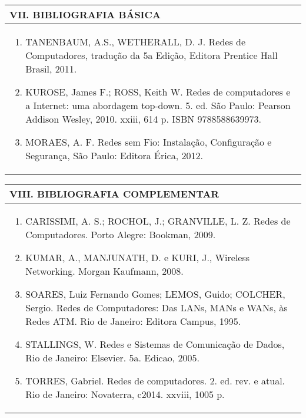 \documentclass[12pt]{article}
\begin{document}

\begin{longtable}{|L{1.025\textwidth}|} \hline
%
{\bf VII. BIBLIOGRAFIA BÁSICA} \\ \hline
\begin{enumerate}
%
\item TANENBAUM, A.S., WETHERALL, D. J. Redes de Computadores, tradução da 5a Edição, Editora Prentice Hall Brasil, 2011. 
\item  KUROSE, James F.; ROSS, Keith W. Redes de computadores e a Internet: uma abordagem top-down. 5. ed. São Paulo: Pearson Addison Wesley, 2010. xxiii, 614 p. ISBN 9788588639973.
\item  MORAES, A. F. Redes sem Fio: Instalação, Configuração e Segurança, São Paulo: Editora Érica, 2012.

\end{enumerate}
 \\ \hline
\end{longtable}


\newpage

\begin{longtable}{|L{1.025\textwidth}|} \hline
%
{\bf VIII. BIBLIOGRAFIA COMPLEMENTAR} \\ \hline
\begin{enumerate}
\item CARISSIMI, A. S.; ROCHOL, J.; GRANVILLE, L. Z. Redes de Computadores. Porto Alegre: Bookman, 2009. 
\item KUMAR, A., MANJUNATH, D. e KURI, J., Wireless Networking. Morgan Kaufmann, 2008. 
\item  SOARES, Luiz Fernando Gomes; LEMOS, Guido; COLCHER, Sergio. Redes de Computadores: Das LANs, MANs e WANs, às Redes ATM. Rio de Janeiro: Editora Campus, 1995. 
\item  STALLINGS, W. Redes e Sistemas de Comunicação de Dados, Rio de Janeiro: Elsevier. 5a. Edicao, 2005.
\item TORRES, Gabriel. Redes de computadores. 2. ed. rev. e atual. Rio de Janeiro: Novaterra, c2014. xxviii, 1005 p.


%
\end{enumerate}
 \\ \hline
\end{longtable}



\end{document}
